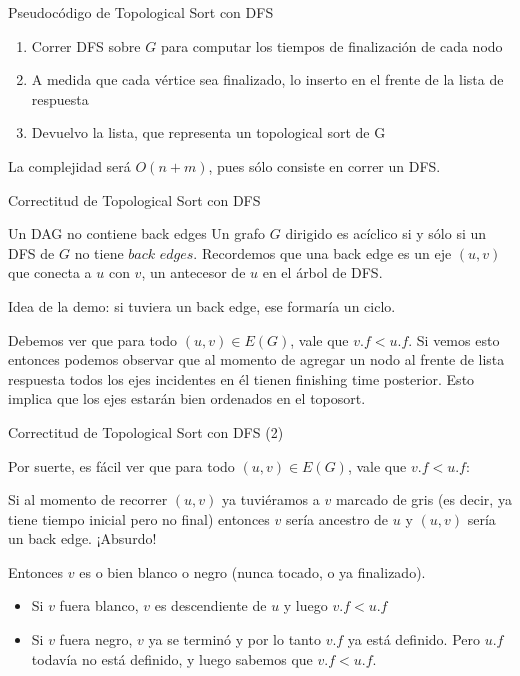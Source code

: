 \documentclass[compress]{beamer}
\newcommand{\bigpause}{\bigskip \pause}
\begin{document}
\begin{frame}{Pseudocódigo de Topological Sort con DFS}

\begin{enumerate}
\item Correr DFS sobre $G$ para computar los tiempos de finalización de cada nodo
\item A medida que cada vértice sea finalizado, lo inserto en el frente de la lista de respuesta
\item Devuelvo la lista, que representa un topological sort de G
\end{enumerate}

La complejidad será $O(n+m)$, pues sólo consiste en correr un DFS.

\end{frame}

\begin{frame}{Correctitud de Topological Sort con DFS}

\begin{block}{Un DAG no contiene back edges}
Un grafo $G$ dirigido es acíclico si y sólo si un DFS de $G$ no tiene
$back$ $edges$. Recordemos que una back edge es un eje $(u, v)$ que conecta
a $u$ con $v$, un antecesor de $u$ en el árbol de DFS.
\end{block}
\bigpause

Idea de la demo: si tuviera un back edge, ese formaría un ciclo.

\bigpause

Debemos ver que para todo $(u, v) \in E(G)$, vale que $v.f < u.f$. Si vemos
esto entonces podemos observar que al momento de agregar un nodo al frente 
de lista respuesta todos los ejes incidentes en él tienen finishing 
time posterior. Esto implica que los ejes estarán bien ordenados en el toposort.

\end{frame}

\begin{frame}{Correctitud de Topological Sort con DFS (2)}

Por suerte, es fácil ver que para todo $(u, v) \in E(G)$, vale que $v.f < u.f$:

\bigskip

Si al momento de recorrer $(u,v)$ ya tuviéramos a $v$ marcado de gris (es decir,
ya tiene tiempo inicial pero no final) entonces $v$ sería ancestro de $u$ y $(u,v)$
sería un back edge. ¡Absurdo!

\bigskip
Entonces $v$ es o bien blanco o negro (nunca tocado, o ya finalizado).
\begin{itemize}
\item Si $v$ fuera blanco, $v$ es descendiente de $u$ y luego $v.f < u.f$
\item Si $v$ fuera negro, $v$ ya se terminó y por lo tanto $v.f$ ya está
definido. Pero $u.f$ todavía no está definido, y luego sabemos que $v.f < u.f$.
\end{itemize}

\end{frame}
\end{document}
